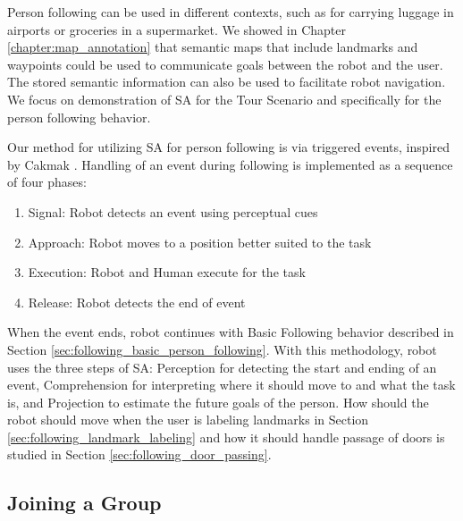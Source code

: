 Person following can be used in different contexts, such as for carrying luggage in airports or groceries in a supermarket. We showed in Chapter \ref{chapter:map_annotation} that semantic maps that include landmarks and waypoints could be used to communicate goals between the robot and the user.  The stored semantic information can also be used to facilitate robot navigation. We focus on demonstration of SA for the Tour Scenario and specifically for the person following behavior.

Our method for utilizing SA for person following is via triggered events, inspired by Cakmak \cite{cakmak2011using}. Handling of an event during following is implemented as a sequence of four phases:

\begin{enumerate}
\item Signal: Robot detects an event using perceptual cues
\item Approach: Robot moves to a position better suited to the task
\item Execution: Robot and Human execute for the task
\item Release: Robot detects the end of event
\end{enumerate}

When the event ends, robot continues with Basic Following behavior described in Section \ref{sec:following_basic_person_following}. With this methodology, robot uses the three steps of SA: Perception for detecting the start and ending of an event, Comprehension for interpreting where it should move to and what the task is, and Projection to estimate the future goals of the person. How should the robot should move when the user is labeling landmarks in Section \ref{sec:following_landmark_labeling} and how it should handle passage of doors is studied in Section \ref{sec:following_door_passing}.



\subsection{Joining a Group}
\label{sec:following_joining_group}


